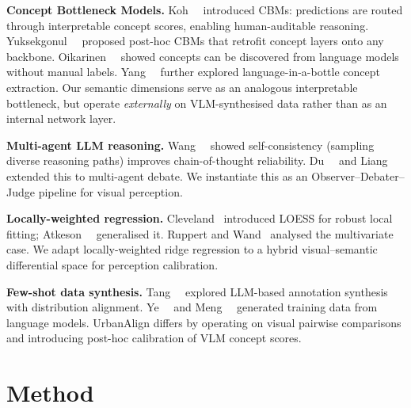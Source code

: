 \documentclass[runningheads]{llncs}
\begin{document}
\smallskip\noindent\textbf{Concept Bottleneck Models.}
Koh~\etal~\cite{koh2020concept} introduced CBMs: predictions are routed through interpretable concept scores, enabling human-auditable reasoning.
Yuksekgonul~\etal~\cite{yuksekgonul2023posthoc} proposed post-hoc CBMs that retrofit concept layers onto any backbone.
Oikarinen~\etal~\cite{oikarinen2023labelfree} showed concepts can be discovered from language models without manual labels.
Yang~\etal~\cite{yang2023language} further explored language-in-a-bottle concept extraction.
Our semantic dimensions serve as an analogous interpretable bottleneck, but operate \emph{externally} on VLM-synthesised data rather than as an internal network layer.

\smallskip\noindent\textbf{Multi-agent LLM reasoning.}
Wang~\etal~\cite{wang2023selfconsistency} showed self-consistency (sampling diverse reasoning paths) improves chain-of-thought reliability.
Du~\etal~\cite{du2024improving} and Liang~\etal~\cite{liang2024encouraging} extended this to multi-agent debate.
We instantiate this as an Observer--Debater--Judge pipeline for visual perception.

\smallskip\noindent\textbf{Locally-weighted regression.}
Cleveland~\cite{cleveland1979robust} introduced LOESS for robust local fitting; Atkeson~\etal~\cite{atkeson1997locally} generalised it.
Ruppert and Wand~\cite{ruppert1994multivariate} analysed the multivariate case.
We adapt locally-weighted ridge regression to a hybrid visual--semantic differential space for perception calibration.

\smallskip\noindent\textbf{Few-shot data synthesis.}
Tang~\etal~\cite{tang2025urbanalign} explored LLM-based annotation synthesis with distribution alignment.
Ye~\etal~\cite{ye2022zerogen} and Meng~\etal~\cite{meng2023tuning} generated training data from language models.
UrbanAlign differs by operating on visual pairwise comparisons and introducing post-hoc calibration of VLM concept scores.


\section{Method}
\label{sec:method}
\end{document}
